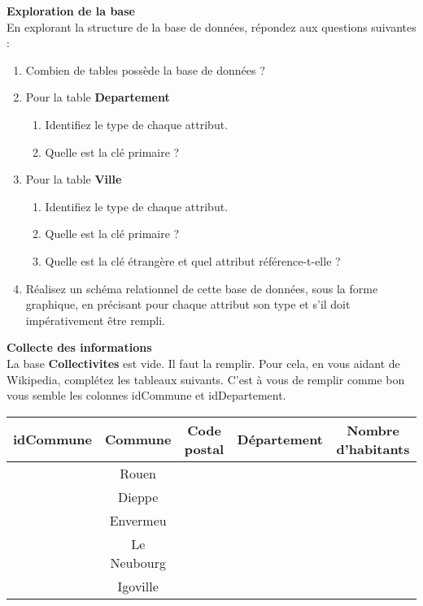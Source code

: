 \documentclass[a4paper,12pt,french]{book}
\begin{document}
\begin{exercice}[ : Collectivites.db]

\textbf{Exploration de la base}\\

En explorant la structure de la base de données, répondez aux questions suivantes :

\begin{enumerate}[\bfseries 1.]
	\item 	Combien de tables possède la base de données ?
	\item 	Pour la table \textbf{Departement}
	\begin{enumerate}[\bfseries a.]
		\item 	Identifiez le type de chaque attribut.
		\item 	Quelle est la clé primaire ?
	\end{enumerate}
	\item Pour la table \textbf{Ville}
		\begin{enumerate}[\bfseries a.]
		\item 	Identifiez le type de chaque attribut.
		\item 	Quelle est la clé primaire ?
		\item 	Quelle est la clé étrangère et quel attribut référence-t-elle ?
	\end{enumerate}
	\item 	 Réalisez un schéma relationnel de cette base de données, sous la forme graphique, en précisant pour chaque attribut son type et s’il doit impérativement être rempli.
\end{enumerate}


\textbf{Collecte des informations}\\

La base \textbf{Collectivites} est vide. Il faut la remplir. Pour cela, en vous aidant de Wikipedia, complétez les tableaux suivants.
C'est à vous de remplir comme bon vous semble les colonnes idCommune et idDepartement.
\begin{center}
\begin{tabular}{|c|c|c|c|c|}
	\hline
	\rowcolor{UGLiOrange}\color{white} idCommune &\color{white}	\textbf{Commune} & \color{white}\textbf{Code postal} & \color{white}\textbf{Département} &\color{white} \textbf{Nombre d'habitants} \\
	\hline\color{black}
	&Rouen &  &  &  \\
	\hline
	&Dieppe &  &  &  \\
	\hline
	&Envermeu &  &  &  \\
	\hline
	&Le Neubourg &  &  &  \\
	\hline
	&Igoville &  &  &  \\
	\hline
\end{tabular}\\[1em]


\end{center}
\end{exercice}
\end{document}
